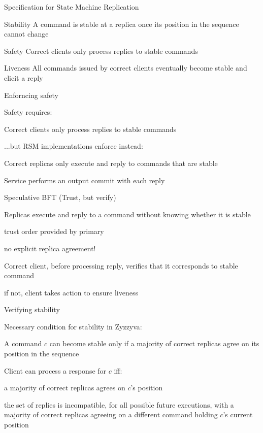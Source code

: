 \begin{frame}{Specification for State Machine Replication}

\begin{block}{Stability}
A command is \alert{stable} at a replica once its position in the sequence cannot change
\end{block}

\smallskip
\begin{block}{Safety}
Correct clients only process replies to stable commands
\end{block}

\begin{block}{Liveness}
All commands issued by correct clients eventually become stable and elicit a reply
\end{block}

\end{frame}

\begin{frame}{Enforncing safety}
\BIL
\item Safety requires:
	\BI
	\item Correct \alert{clients} only process replies to stable commands
	\EI
\item ...but RSM implementations enforce instead:
\BI
\item Correct \alert{replicas} only execute and reply to commands that are stable
\EI
\item  Service performs an output commit with each reply
\EIL
\end{frame}

\begin{frame}{Speculative BFT (Trust, but verify)}

\BIL
\item  Replicas execute and reply to a command without knowing whether it is stable
	\BI
	\item trust order provided by primary 
	\item no explicit replica agreement!
	\EI
\item Correct client, before processing reply, verifies that it corresponds to stable command
	\BI
	\item if not, client takes action to ensure liveness	
	\EI	
\EIL
	
\end{frame}

\begin{frame}{Verifying stability}
	
\BIL
\item Necessary condition for stability in Zyzzyva:
\BI
\item A command $c$ can become stable only if a majority of correct replicas
agree on its position in the sequence
\EI
\item Client can process a response for $c$ iff: 
\BI
\item a majority of correct replicas agrees on $c$'s position
\item the set of replies is incompatible, for all possible future executions,
with a majority of correct replicas agreeing on a different command holding
$c$'s current position
\EI
\EIL

\end{frame}

